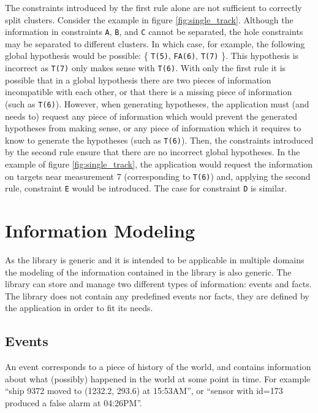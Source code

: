 The constraints introduced by the first rule alone are not sufficient to correctly split clusters. Consider the example in figure \ref{fig:single_track}. Although the information in constraints \texttt{A}, \texttt{B}, and \texttt{C} cannot be separated, the hole constraints may be separated to different clusters. In which case, for example, the following global hypothesis would be possible: \{ \texttt{T(5)}, \texttt{FA(6)}, \texttt{T(7)} \}. This hypothesis is incorrect as \texttt{T(7)} only makes sense with \texttt{T(6)}. With only the first rule it is possible that in a global hypothesis there are two pieces of information incompatible with each other, or that there is a missing piece of information (such as \texttt{T(6)}). However, when generating hypotheses, the application must (and needs to) request any piece of information which would prevent the generated hypotheses from making sense, or any piece of information which it requires to know to generate the hypotheses (such as \texttt{T(6)}). Then, the constraints introduced by the second rule ensure that there are no incorrect global hypotheses. In the example of figure \ref{fig:single_track}, the application would request the information on targets near measurement 7 (corresponding to \texttt{T(6)}) and, applying the second rule, constraint \texttt{E} would be introduced. The case for constraint \texttt{D} is similar.


\section{Information Modeling}
\label{sec:information_modeling}

As the library is generic and it is intended to be applicable in multiple domains the modeling of the information contained in the library is also generic. The library can store and manage two different types of information: events and facts. The library does not contain any predefined events nor facts, they are defined by the application in order to fit its needs.

\subsection{Events}

An event corresponds to a piece of history of the world, and contains information about what (possibly) happened in the world at some point in time. For example ``ship 9372 moved to (1232.2, 293.6) at 15:53AM'', or ``sensor with id=173 produced a false alarm at 04:26PM''.


